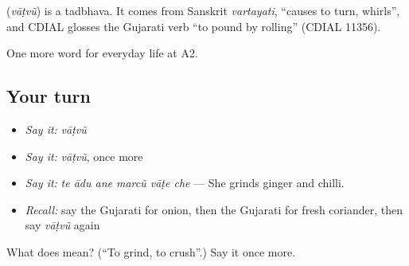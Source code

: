 \begin{cousinweb}
\textbf{} (\emph{vāṭvũ}) is a tadbhava. It comes from Sanskrit \emph{vartayati}, \textquotedblleft{}causes to turn, whirls\textquotedblright{}, and CDIAL glosses the Gujarati verb \textquotedblleft{}to pound by rolling\textquotedblright{} (CDIAL 11356).
\end{cousinweb}

\begin{grammarlens}[title={What you've built}]
One more word for everyday life at A2.
\end{grammarlens}

\subsection*{Your turn}
\begin{itemize}
\raggedright
  \item \emph{Say it:} \emph{vāṭvũ}
  \item \emph{Say it:} \emph{vāṭvũ}, once more
  \item \emph{Say it:} \emph{te ādu ane marcũ vāṭe che} — She grinds ginger and chilli.
  \item \emph{Recall:} say the Gujarati for onion, then the Gujarati for fresh coriander, then say \emph{vāṭvũ} again
\end{itemize}

\begin{tcolorbox}[breakable,colback=teal!4,colframe=teal!35!black,title={Before you move on}]
What does  mean? (\textquotedblleft{}To grind, to crush\textquotedblright{}.) Say it once more.
\end{tcolorbox}
